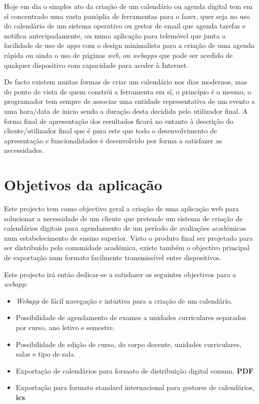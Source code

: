 \documentclass[11pt, twoside]{report}
\begin{document}
	Hoje em dia o simples ato da criação de um calendário ou agenda digital tem em sî concentrado uma vasta panóplia de ferramentas para o fazer, quer seja no uso do calendário de um sistema operativo ou gestor de email que agenda tarefas e notifica antecipadamente, ou numa aplicação para telemóvel que junta a facilidade de uso de \textit{apps} com o design minimalista para a criação de uma agenda rápida ou ainda o uso de páginas \textit{web}, ou \textit{webapps} que pode ser acedido de qualquer dispositivo com capacidade para aceder à Internet. 
	
	De facto existem muitas formas de criar um calendário nos dias modernos, mas do ponto de vista de quem constrói a ferramenta em sî, o princípio é o mesmo, o programador tem sempre de associar uma entidade representativa de um evento a uma hora/data de inicio sendo a duração desta decidida pelo utilizador final. 
	A forma final de apresentação dos resultados ficará no entanto à descrição do cliente/utilizador final que é para este que todo o desenvolvimento de apresentação e funcionalidades é desenvolvido por forma a satisfazer as necessidades. 
	\section{Objetivos da aplicação}
	
	Este projecto tem como objectivo geral a criação de uma aplicação web para solucionar a necessidade de um cliente que pretende um sistema de criação de calendários digitais para agendamento de um período de avaliações académicas num estabelecimento de ensino superior. 
	Visto o produto final ser projetado para ser distribuído pela comunidade académica, existe também o objectivo principal de exportação num formato facilmente transmissível entre dispositivos.  
	
	Este projecto irá então dedicar-se a satisfazer os seguintes objectivos para a \textit{webapp}: 
	\begin{itemize} 
		\item \textit{Webapp} de fácil navegação e intuitiva para a criação de um calendário. 
		\item Possibilidade de agendamento de exames a unidades curriculares separados por curso, ano letivo e semestre.   
		\item Possibilidade de edição de curso, do corpo docente, unidades curriculares, salas e tipo de sala. 
		\item Exportação de calendários para formato de distribuição digital comum, \textbf{PDF}. 
		\item Exportação para formato standard internacional para gestores de calendários, \textbf{ics}.  
	\end{itemize} 
\end{document}
